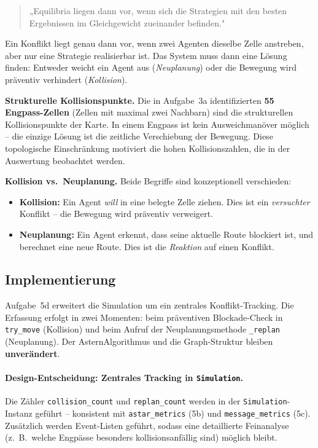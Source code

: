 \begin{quote}
„Equilibria liegen dann vor, wenn sich die Strategien mit den besten Ergebnissen im Gleichgewicht zueinander befinden."
\end{quote}

Ein Konflikt liegt genau dann vor, wenn zwei Agenten dieselbe Zelle anstreben, aber nur eine Strategie realisierbar ist. Das System muss dann eine Lösung finden: Entweder weicht ein Agent aus (\textit{Neuplanung}) oder die Bewegung wird präventiv verhindert (\textit{Kollision}).

\textbf{Strukturelle Kollisionspunkte.} Die in Aufgabe~3a identifizierten \textbf{55 Engpass-Zellen} (Zellen mit maximal zwei Nachbarn) sind die strukturellen Kollisionspunkte der Karte. In einem Engpass ist kein Ausweichmanöver möglich -- die einzige Lösung ist die zeitliche Verschiebung der Bewegung. Diese topologische Einschränkung motiviert die hohen Kollisionszahlen, die in der Auswertung beobachtet werden.

\textbf{Kollision vs.\ Neuplanung.} Beide Begriffe sind konzeptionell verschieden:

\begin{itemize}
    \item \textbf{Kollision:} Ein Agent \textit{will} in eine belegte Zelle ziehen. Dies ist ein \textit{versuchter} Konflikt -- die Bewegung wird präventiv verweigert.
    \item \textbf{Neuplanung:} Ein Agent erkennt, dass seine aktuelle Route blockiert ist, und berechnet eine neue Route. Dies ist die \textit{Reaktion} auf einen Konflikt.
\end{itemize}

\subsection{Implementierung}

Aufgabe~5d erweitert die Simulation um ein zentrales Konflikt-Tracking. Die Erfassung erfolgt in zwei Momenten: beim präventiven Blockade-Check in \texttt{try\_move} (Kollision) und beim Aufruf der Neuplanungsmethode \texttt{\_replan} (Neuplanung). Der \acs{Astern}Algorithmus und die Graph-Struktur bleiben \textbf{unverändert}.

\paragraph{Design-Entscheidung: Zentrales Tracking in \texttt{Simulation}.}
Die Zähler \texttt{collision\_count} und \texttt{replan\_count} werden in der \texttt{Simulation}-Instanz geführt -- konsistent mit \texttt{astar\_metrics} (5b) und \texttt{message\_metrics} (5c). Zusätzlich werden Event-Listen geführt, sodass eine detaillierte Feinanalyse (z.~B.\ welche Engpässe besonders kollisionsanfällig sind) möglich bleibt.

